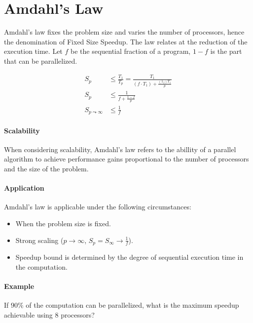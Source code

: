 \section{Amdahl's Law}

Amdahl's law fixes the problem size and varies the number of processors,
hence the denomination of Fixed Size Speedup.
The law relates at the reduction of the execution time.
Let $f$ be the sequential fraction of a program, $1-f$ is the part that can be parallelized.

\begin{equation}
    \begin{split}
        S_p & \le \frac{T_1}{T_p} = \frac{T_1}{(f \cdot T_1) + \frac{(1_f)T_1}{p}}\\
        S_p & \le \frac{1}{f + \frac{1-f}{p}}\\
        S_{p \leadsto \infty} & \le \frac{1}{f}
    \end{split}
\end{equation}

\paragraph{Scalability}
When considering scalability, Amdahl's law refers to the abillity of a parallel algorithm to achieve performance gains proportional to the number of processors and the size of the problem.

\paragraph{Application}

Amdahl's law is applicable under the following circumstances:
\begin{itemize}
    \item When the problem size is fixed.
    \item Strong scaling ($p\rightarrow\infty$, $S_p = S_{\infty} \rightarrow \frac{1}{f}$).
    \item Speedup bound is determined by the degree of sequential execution time in the computation.
\end{itemize}

\paragraph{Example}

If $90\%$ of the computation can be parallelized, what is the maximum speedup achievable using 8 processors?

